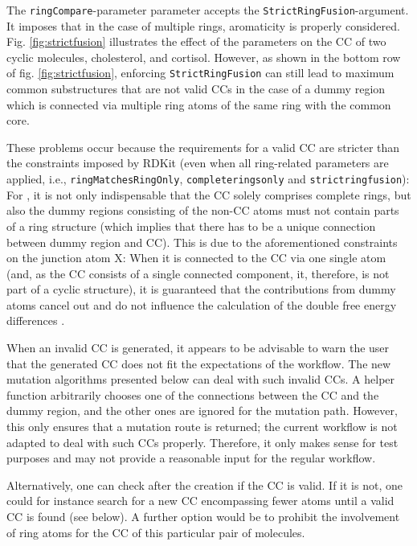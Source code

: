 The \texttt{ringCompare}-parameter parameter accepts the \texttt{StrictRingFusion}-argument.
It imposes that in the case of multiple rings, aromaticity is properly
considered. Fig. \ref{fig:strictfusion} illustrates the effect of the parameters
on the CC of two cyclic molecules, cholesterol, and cortisol. However, as shown in the bottom row of fig. \ref{fig:strictfusion}, enforcing
\texttt{StrictRingFusion} can still lead to maximum common substructures
that are not valid {\trafo} CCs in the case of a dummy region
which is connected via multiple ring atoms of the same ring with the common
core. 

These problems occur because the requirements for a valid {\trafo} CC are stricter than the constraints imposed by RDKit  (even when all ring-related parameters are applied, i.e., \texttt{ringMatchesRingOnly}, \texttt{completeringsonly} and \texttt{strictringfusion}): For {\trafo}, it is not only indispensable that the CC solely comprises complete rings, but also the dummy regions consisting of the non-CC atoms must not contain parts of a ring structure (which implies that there has to be a unique connection between dummy region and CC). This is due to the aforementioned constraints on the junction atom X: When it is connected to the CC via one single atom (and, as the CC consists of a single connected component, it, therefore, is not part of a cyclic structure), it is guaranteed that the contributions from dummy atoms cancel out and do not influence the calculation of the double free energy differences \cite{Karwounopoulos.2022}.

When an invalid CC is generated, it appears to be advisable to warn the user that the generated CC does not fit the expectations of the {\trafo} workflow. 
The new mutation algorithms presented below can deal with such invalid CCs. A helper function arbitrarily chooses one of the connections between the CC and the dummy region, and the other ones are ignored for the mutation path. However, this only ensures that a mutation route is returned; the current {\trafo} workflow is not adapted to deal with such CCs properly. Therefore, it only makes sense for test purposes and may not provide a reasonable input for the regular workflow.

Alternatively, one can check after the creation if the CC is valid. If
it is not, one could for instance search for a new CC encompassing fewer
atoms until a valid CC is found (see below). A further option would be to prohibit the involvement of ring atoms for the CC of this particular pair of molecules.


